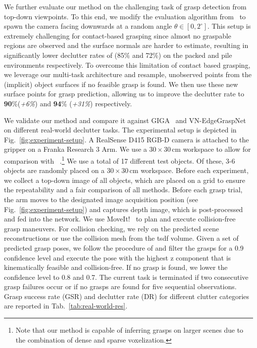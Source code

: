 \documentclass[letterpaper, 10 pt, conference]{ieeeconf}  %
\begin{document}
We further evaluate our method on the challenging task of grasp detection from top-down viewpoints. To this end, we modify the evaluation algorithm from~\cite{huang2022edge} to spawn the camera facing downwards at a random angle $\theta \in [0,2^\circ]$. This setup is extremely challenging for contact-based grasping since almost no graspable regions are observed and the surface normals are harder to estimate, resulting in significantly lower declutter rates of (85\% and 72\%) on the packed and pile environments respectively. To overcome this limitation of contact based grasping, we leverage our multi-task architecture and resample, unobserved points from the (implicit) object surfaces if no feasible grasp is found. We then use these new surface points for grasp prediction, allowing us to improve the declutter rate to \textbf{90}\%(\emph{+6\%}) and \textbf{94}\% (\emph{+31\%}) respectively.


We validate our method and compare it against GIGA~\cite{Jiang2021SynergiesBA} and VN-EdgeGraspNet~\cite{huang2022edge} on different real-world declutter tasks. The experimental setup is depicted in Fig.~\ref{fig:experiment-setup}. A RealSense D415 RGB-D camera is attached to the gripper on a Franka Research 3 Arm. 
We use a $30 \times 30$\,cm workspace to allow for comparison with ~\cite{Jiang2021SynergiesBA}.\footnote{Note that our method is capable of inferring grasps on larger scenes due to the combination of dense and sparse voxelization.}
We use a total of 17 different test objects. 
Of these, 3-6 objects are randomly placed on a $30 \times 30$\,cm workspace.
Before each experiment, we collect a top-down image of all objects, which are placed on a grid to ensure the repeatability and a fair comparison of all methods.
Before each grasp trial, the arm moves to the designated image acquisition position (see Fig.~\ref{fig:experiment-setup}) and captures depth image, which is post-processed and fed into the network. We use MoveIt!~\cite{coleman2014reducing} to plan and execute collision-free grasp maneuvers. For collision checking, we rely on the predicted scene reconstructions or use the collision mesh from the tsdf volume.%
%
Given a set of predicted grasp poses, we follow the procedure of \cite{huang2022edge} and filter the grasps for a 0.9 confidence level and execute the pose with the highest z component that is kinematically feasible and collision-free. If no grasp is found, we lower the confidence level to 0.8 and 0.7. The current task is terminated if two consecutive grasp failures occur or if no grasps are found for five sequential observations. Grasp success rate (GSR) and declutter rate (DR) for different clutter categories are reported in Tab.~\ref{tab:real-world-res}.
\end{document}
